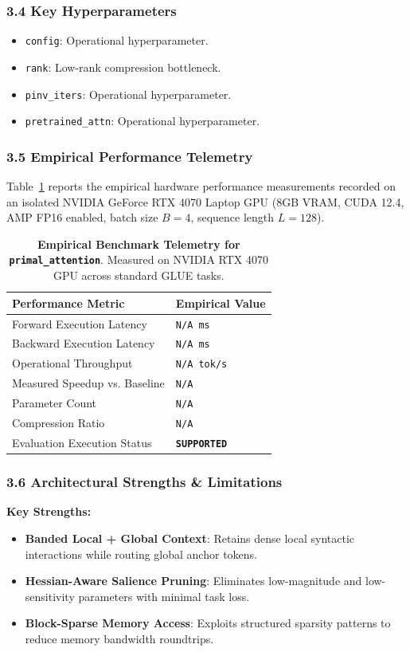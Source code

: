 \subsubsection*{3.4 Key Hyperparameters}
\begin{itemize}
    \item \texttt{config}: Operational hyperparameter.
    \item \texttt{rank}: Low-rank compression bottleneck.
    \item \texttt{pinv\_iters}: Operational hyperparameter.
    \item \texttt{pretrained\_attn}: Operational hyperparameter.
\end{itemize}

\subsubsection*{3.5 Empirical Performance Telemetry}
Table~\ref{tab:telemetry_primal_attention} reports the empirical hardware performance measurements recorded on an isolated NVIDIA GeForce RTX 4070 Laptop GPU (8GB VRAM, CUDA 12.4, AMP FP16 enabled, batch size $B=4$, sequence length $L=128$).

\begin{table}[h]
\centering
\small
\caption{\textbf{Empirical Benchmark Telemetry for \texttt{primal\_attention}}. Measured on NVIDIA RTX 4070 GPU across standard GLUE tasks.}
\label{tab:telemetry_primal_attention}
\begin{tabularx}{\columnwidth}{lX}
\toprule
\textbf{Performance Metric} & \textbf{Empirical Value} \\
\midrule
Forward Execution Latency & \texttt{N/A ms} \\
Backward Execution Latency & \texttt{N/A ms} \\
Operational Throughput & \texttt{N/A tok/s} \\
Measured Speedup vs. Baseline & \texttt{N/A} \\
Parameter Count & \texttt{N/A} \\
Compression Ratio & \texttt{N/A} \\
Evaluation Execution Status & \textbf{\texttt{SUPPORTED}} \\
\bottomrule
\end{tabularx}
\end{table}

\subsubsection*{3.6 Architectural Strengths \& Limitations}
\textbf{Key Strengths:}
\begin{itemize}
    \item \textbf{Banded Local + Global Context}: Retains dense local syntactic interactions while routing global anchor tokens.
    \item \textbf{Hessian-Aware Salience Pruning}: Eliminates low-magnitude and low-sensitivity parameters with minimal task loss.
    \item \textbf{Block-Sparse Memory Access}: Exploits structured sparsity patterns to reduce memory bandwidth roundtrips.
\end{itemize}

